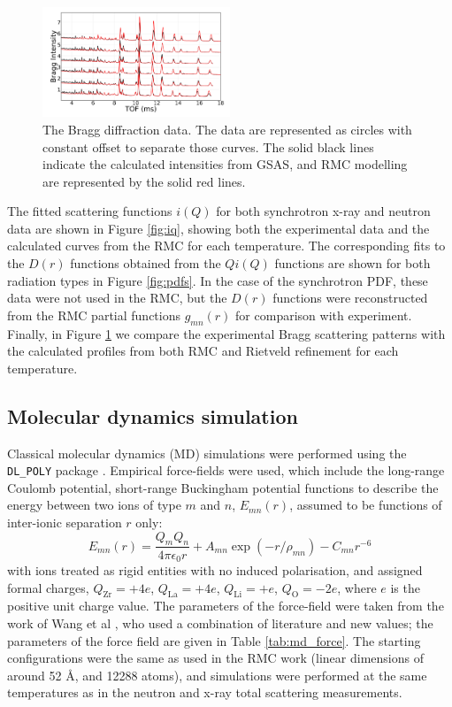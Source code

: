 \documentclass[twoside,twocolumn,9pt]{article}
\begin{document}
\begin{figure}[t]
\centering
\includegraphics[width=0.5\textwidth]{Pics/bragg.pdf}
\caption{The Bragg diffraction data. The data are represented as circles with constant offset to separate those curves.
The solid black lines indicate the  calculated intensities from GSAS, and RMC modelling are represented by the solid red lines. }
\label{fig:Rietveld_refinement}
\end{figure}

The fitted scattering functions $i(Q)$ for both synchrotron x-ray and neutron data are shown in Figure \ref{fig:iq}, showing both the experimental data and the calculated curves from the RMC for each temperature. The corresponding fits to the $D(r)$ functions obtained from the $Qi(Q)$ functions are shown for both radiation types in Figure \ref{fig:pdfs}. In the case of the synchrotron PDF, these data were not used in the RMC, but the $D(r)$ functions were reconstructed from the RMC partial functions $g_{mn}(r)$ for comparison with experiment. Finally, in Figure \ref{fig:Rietveld_refinement} we compare the experimental Bragg scattering patterns with the calculated profiles from both RMC and Rietveld refinement for each temperature.

\subsection{Molecular dynamics simulation}

Classical molecular dynamics (MD) simulations were performed using the \texttt{DL\_POLY} package \cite{Todorov:2006ee}.
Empirical force-fields were used, which include the long-range Coulomb potential,
short-range Buckingham potential functions to describe the energy between two ions of type $m$ and $n$, $E_{mn}(r)$, assumed to be functions of inter-ionic separation $r$ only:
\begin{equation} \label{eq:buckingham}
E_{mn}(r) = \frac{Q_m Q_n}{4 \pi \epsilon_0 r} + A_{mn} \exp(-r/\rho_{mn}) - C_{mn}r^{-6}
\end{equation}
with ions treated as rigid entities with no induced polarisation, and assigned formal charges, $Q_\mathrm{Zr} = +4e$, $Q_\mathrm{La} = +4e$, $Q_\mathrm{Li} = +e$, $Q_\mathrm{O} = -2e$, where $e$ is the positive unit charge value. The parameters of the force-field were taken from the work of Wang et al  \cite{Wang:2014ic}, who used a combination of literature and new values; the parameters of the force field are given in Table \ref{tab:md_force}. The starting configurations were the same as used in the RMC work (linear dimensions of around 52 \AA, and 12288 atoms), and simulations were performed at the same temperatures as in the neutron and x-ray total scattering measurements.
\end{document}
